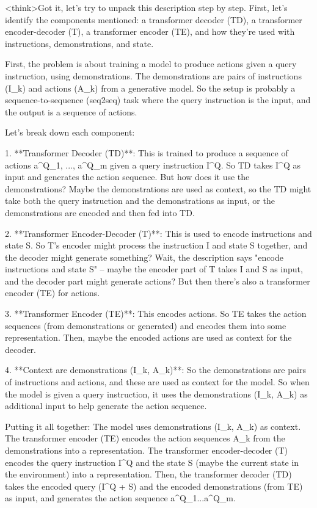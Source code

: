 <think>Got it, let's try to unpack this description step by step. First, let's identify the components mentioned: a transformer decoder (TD), a transformer encoder-decoder (T), a transformer encoder (TE), and how they're used with instructions, demonstrations, and state.

First, the problem is about training a model to produce actions given a query instruction, using demonstrations. The demonstrations are pairs of instructions (I_k) and actions (A_k) from a generative model. So the setup is probably a sequence-to-sequence (seq2seq) task where the query instruction is the input, and the output is a sequence of actions.

Let's break down each component:

1. **Transformer Decoder (TD)**: This is trained to produce a sequence of actions a^Q_1, ..., a^Q_m given a query instruction I^Q. So TD takes I^Q as input and generates the action sequence. But how does it use the demonstrations? Maybe the demonstrations are used as context, so the TD might take both the query instruction and the demonstrations as input, or the demonstrations are encoded and then fed into TD.

2. **Transformer Encoder-Decoder (T)**: This is used to encode instructions and state S. So T's encoder might process the instruction I and state S together, and the decoder might generate something? Wait, the description says "encode instructions and state S" – maybe the encoder part of T takes I and S as input, and the decoder part might generate actions? But then there's also a transformer encoder (TE) for actions.

3. **Transformer Encoder (TE)**: This encodes actions. So TE takes the action sequences (from demonstrations or generated) and encodes them into some representation. Then, maybe the encoded actions are used as context for the decoder.

4. **Context are demonstrations (I_k, A_k)**: So the demonstrations are pairs of instructions and actions, and these are used as context for the model. So when the model is given a query instruction, it uses the demonstrations (I_k, A_k) as additional input to help generate the action sequence.

Putting it all together: The model uses demonstrations (I_k, A_k) as context. The transformer encoder (TE) encodes the action sequences A_k from the demonstrations into a representation. The transformer encoder-decoder (T) encodes the query instruction I^Q and the state S (maybe the current state in the environment) into a representation. Then, the transformer decoder (TD) takes the encoded query (I^Q + S) and the encoded demonstrations (from TE) as input, and generates the action sequence a^Q_1...a^Q_m.

